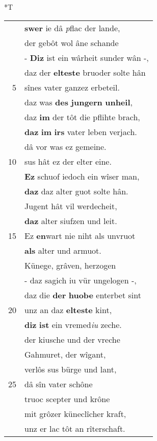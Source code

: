 \documentclass[8pt,a4paper,notitlepage]{article}
\begin{document}
\begin{table}[ht]
\begin{minipage}[t]{0.5\linewidth}
\end{minipage}
\hspace{0.5cm}
\begin{minipage}[t]{0.5\linewidth}
\small
\begin{center}*T
\end{center}
\begin{tabular}{rl}
 & \textbf{swer} ie dâ \textit{p}flac der lande,\\ 
 & der gebôt wol âne schande\\ 
 & - \textbf{Diz} ist ein wârheit sunder wân -,\\ 
 & daz der \textbf{elteste} bruoder solte hân\\ 
5 & sînes vater ganzez erbeteil.\\ 
 & daz was \textbf{des} \textbf{jungern} \textbf{unheil},\\ 
 & daz \textbf{im} der tôt die pflihte brach,\\ 
 & \textbf{daz} \textbf{im} \textbf{irs} vater leben verjach.\\ 
 & dâ vor was ez gemeine.\\ 
10 & sus hât ez der elter eine.\\ 
 & \textbf{Ez} schuof iedoch ein wîser man,\\ 
 & \textbf{daz} daz alter guot solte hân.\\ 
 & Jugent hât vil werdecheit,\\ 
 & \textbf{daz} alter siufzen und leit.\\ 
15 & Ez \textbf{en}wart nie niht als unvruot\\ 
 & \textbf{als} alter und armuot.\\ 
 & Künege, grâven, herzogen\\ 
 & - daz sagich iu vür ungelogen -,\\ 
 & daz die \textbf{der} \textbf{huobe} enterbet sint\\ 
20 & unz an daz \textbf{elteste} kint,\\ 
 & \textbf{diz} \textbf{ist} ein vremed\textit{iu} zeche.\\ 
 & der kiusche und der vreche\\ 
 & Gahmuret, der wîgant,\\ 
 & verlôs sus bürge und lant,\\ 
25 & dâ sîn vater schône\\ 
 & truoc scepter und krône\\ 
 & mit grôzer küneclîcher kraft,\\ 
 & unz er lac tôt an rîterschaft.\\ 

\end{tabular}
\end{minipage}
\end{table}
\end{document}
